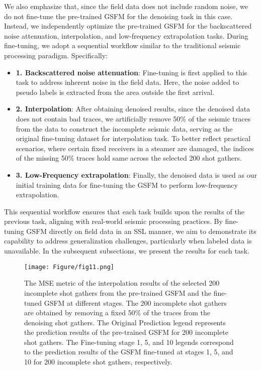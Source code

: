 We also emphasize that, since the field data does not include random noise, we do not fine-tune the pre-trained GSFM for the denoising task in this case. Instead, we independently optimize the pre-trained GSFM for the backscattered noise attenuation, interpolation, and low-frequency extrapolation tasks. During fine-tuning, we adopt a sequential workflow similar to the traditional seismic processing paradigm. Specifically:
\begin{itemize}
    \item \textbf{1. Backscattered noise attenuation}: Fine-tuning is first applied to this task to address inherent noise in the field data. Here, the noise added to pseudo labels is extracted from the area outside the first arrival.
    \item \textbf{2. Interpolation}: After obtaining denoised results, since the denoised data does not contain bad traces, we artificially remove 50\% of the seismic traces from the data to construct the incomplete seismic data, serving as the original fine-tuning dataset for interpolation task. To better reflect practical scenarios, where certain fixed receivers in a steamer are damaged, the indices of the missing 50\% traces hold same across the selected 200 shot gathers.
    \item \textbf{3. Low-Frequency extrapolation}: Finally, the denoised data is used as our initial training data for fine-tuning the GSFM to perform low-frequency extrapolation.
\end{itemize}

This sequential workflow ensures that each task builds upon the results of the previous task, aligning with real-world seismic processing practices. By fine-tuning GSFM directly on field data in an SSL manner, we aim to demonstrate its capability to address generalization challenges, particularly when labeled data is unavailable. In the subsequent subsections, we present the results for each task. 

\begin{figure*}[htbp]
\centering
\texttt{[image: Figure/fig11.png]}
\caption{The MSE metric of the interpolation results of the selected 200 incomplete shot gathers from the pre-trained GSFM and the fine-tuned GSFM at different stages. The 200 incomplete shot gathers are obtained by removing a fixed 50\% of the traces from the denoising shot gathers. The Original Prediction legend represents the prediction results of the pre-trained GSFM for 200 incomplete shot gathers. The Fine-tuning stage 1, 5, and 10 legends correspond to the prediction results of the GSFM fine-tuned at stages 1, 5, and 10 for 200 incomplete shot gathers, respectively.}
\label{fig11}
\end{figure*}

